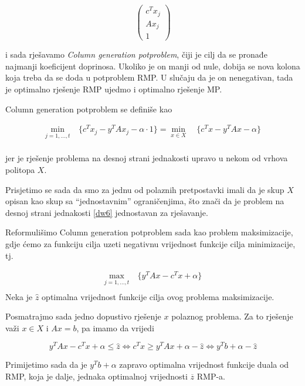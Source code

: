 \documentclass[a4paper, utf8, 11pt, colorlinks]{book}
\begin{document}
 $$\left(\begin{array}{c}
 	c^Tx_j\\
 	Ax_j\\
 	1 
 \end{array}\right)$$
 
 i sada rješavamo \emph{Column generation potproblem}, čiji je cilj da se pronađe najmanji koeficijent doprinosa. Ukoliko je on manji od nule, dobija se nova kolona koja treba da se doda u potproblem RMP.  U slučaju da je on nenegativan, tada je optimalno rješenje RMP ujedmo i optimalno rješenje MP.
 
 Column generation potproblem se definiše kao
 
      \begin{equation}
 	\begin{aligned}\label{dw6}
 		\min_{j=1,\ldots,t}\  & \{c^Tx_j-y^T	Ax_j-\alpha\cdot 1\}=\min_{x\in X}\  & \{c^Tx-y^T	Ax-\alpha\}\\
 	\end{aligned}
 \end{equation}
 
jer je rješenje problema na desnoj strani jednakosti upravo u nekom od vrhova politopa $X$.

Prisjetimo se sada da smo za jednu od polaznih pretpostavki imali da je skup $X$ opisan kao skup sa ``jednostavnim'' ograničenjima, što znači da je problem na desnoj strani jednakosti \ref{dw6} jednostavan za rješavanje.

Reformulišimo  Column generation potproblem sada kao problem maksimizacije, gdje ćemo za funkciju cilja uzeti negativnu vrijednost funkcije cilja minimizacije, tj.
 
 
       \begin{equation}
 	\begin{aligned}\label{dw7}
 		\max_{j=1,\ldots,t}\  &  \{y^T	Ax-c^Tx+\alpha\}\\
 	\end{aligned}
 \end{equation}
Neka je $\hat{z}$ optimalna vrijednost funkcije cilja ovog problema maksimizacije.

Posmatrajmo sada jedno dopustivo rješenje $x$ polaznog problema. Za to rješenje važi 
$x\in X$ i $Ax=b$, pa imamo da vrijedi %
 
 $$y^T	Ax-c^Tx+\alpha\leqslant \hat{z} \Leftrightarrow c^Tx\geqslant y^T	Ax+\alpha-\hat{z} \Leftrightarrow  y^T b+\alpha-\hat{z}$$
 
 Primijetimo sada da je  $y^T b+\alpha$ zapravo  optimalna vrijednost funkcije duala od RMP, koja je dalje, jednaka optimalnoj vrijednosti $\overline{z}$ RMP-a. 
 
\end{document}
